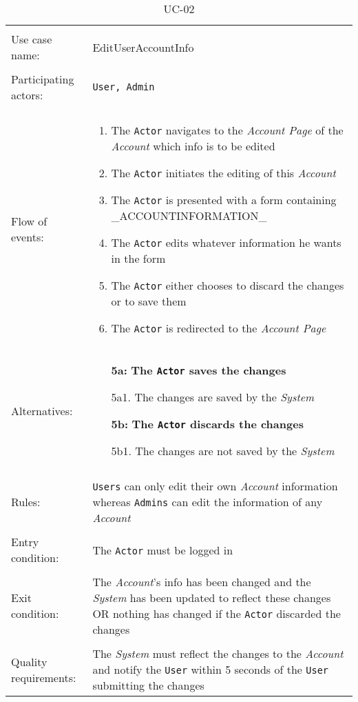 \documentclass[../report.tex]{subfiles}
\begin{document}
\noindent
\begin{table}
\caption{UC-02}
\label{UC-02}
\begin{tabular}{ l  p{8cm} } 
\hline 
\\
Use case name:  & EditUserAccountInfo   \\   \hline    
\\            
Participating actors:  & \texttt{User, \texttt{Admin}} \\   \hline   
\\      
Flow of events: & \begin{enumerate}
\item{The \texttt{Actor} navigates to the \textit{Account Page} of the \textit{Account} which info is to be edited}
\item{The \texttt{Actor} initiates the editing of this \textit{Account}}
\item{The \texttt{Actor} is presented with a form containing \_ACCOUNTINFORMATION\_}
\item{The \texttt{Actor} edits whatever information he wants in the form}
\item{The \texttt{Actor} either chooses to discard the changes or to save them}
\item{The \texttt{Actor} is redirected to the \textit{Account Page}}
\end{enumerate}
\\
Alternatives: & \begin{itemize}
\item[\textbf{5a:}]{\textbf{The \texttt{Actor} saves the changes}}
\item[]  5a1. The changes are saved by the \textit{System}
\item[\textbf{5b:}]\textbf{The \texttt{Actor} discards the changes}
\item[]  5b1. The changes are not saved by the \textit{System}
\end{itemize}
\\ \hline
\\
Rules: & \texttt{Users} can only edit their own \textit{Account} information whereas \texttt{Admins} can edit the information of any  \textit{Account}
\\   \hline 
\\
Entry condition: & The \texttt{Actor} must be logged in \\ \hline
\\
Exit condition: & The \textit{Account}'s info has been changed and the \textit{System} has been updated to reflect these changes OR
nothing has changed if the \texttt{Actor} discarded the changes\\ \hline
\\
Quality requirements: & The \textit{System} must reflect the changes to the \textit{Account} and notify the \texttt{User} within 5 seconds of the \texttt{User} submitting the changes \\ \hline  
\end{tabular}
\end{table}
\end{document}
